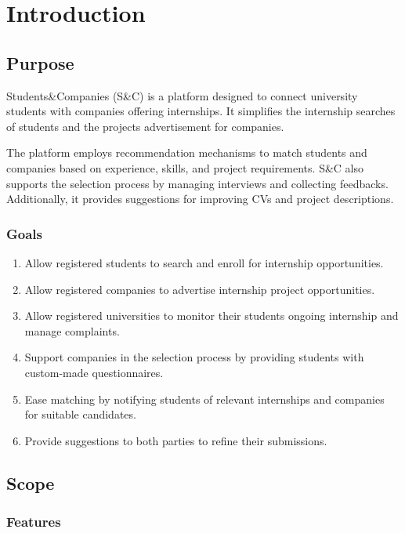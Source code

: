 \chapter{Introduction}

\section{Purpose}

Students\&Companies (S\&C) is a platform designed to connect university students with companies offering internships.
It simplifies the internship searches of students and the projects advertisement for companies.

The platform employs recommendation mechanisms to match students and companies based on experience, skills, and project requirements.
S\&C also supports the selection process by managing interviews and collecting feedbacks.
Additionally, it provides suggestions for improving CVs and project descriptions.

\subsection{Goals}

\begin{enumerate}[label=\textbf{G\arabic* -}]
   \item Allow registered students to search and enroll for internship opportunities.
   \item Allow registered companies to advertise internship project opportunities.
   \item Allow registered universities to monitor their students ongoing internship and manage complaints.
   \item Support companies in the selection process by providing students with custom-made questionnaires.
   \item Ease matching by notifying students of relevant internships and companies for suitable candidates.
   \item Provide suggestions to both parties to refine their submissions.
\end{enumerate}

\section{Scope}

\subsection{Features}

